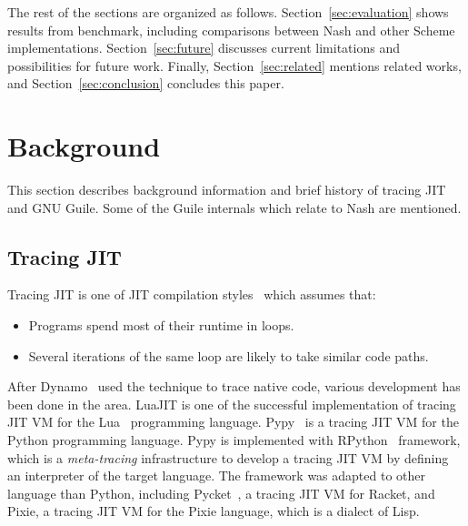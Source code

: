 \documentclass[preprint, 10pt]{sigplanconf}
\begin{document}
The rest of the sections are organized as follows.
Section~\hyperref[sec:evaluation]{\ref{sec:evaluation}} shows results from
benchmark, including comparisons between Nash and other Scheme
implementations. Section~\hyperref[sec:conclusion]{\ref{sec:future}} discusses
current limitations and possibilities for future work. Finally,
Section~\hyperref[sec:related]{\ref{sec:related}} mentions related works, and
Section~\hyperref[sec:conclusion]{\ref{sec:conclusion}} concludes this paper.

\section{Background}
\label{sec:background}

This section describes background information and brief history of tracing JIT
and GNU Guile. Some of the Guile internals which relate to Nash are mentioned.

\subsection{Tracing JIT}
Tracing JIT is one of JIT compilation styles~\cite{bolz2009tracing} which
assumes that:

\begin{itemize}
\item Programs spend most of their runtime in loops.
\item Several iterations of the same loop are likely to take similar code
  paths.
\end{itemize}

After Dynamo~\cite{bala2000dynamo} used the technique to trace native code,
various development has been done in the area. LuaJIT is one of the successful
implementation of tracing JIT VM for the Lua~\cite{ierusalimschy1996lua}
programming language. Pypy~\cite{bolz2009tracing} is a tracing JIT VM for the
Python programming language. Pypy is implemented with
RPython~\cite{bolz2009tracing} framework, which is a \textit{meta-tracing}
infrastructure to develop a tracing JIT VM by defining an interpreter of the
target language. The framework was adapted to other language than Python,
including Pycket~\citep{bauman2015pycket}, a tracing JIT VM for Racket, and
Pixie, a tracing JIT VM for the Pixie language, which is a dialect of Lisp.
\end{document}
